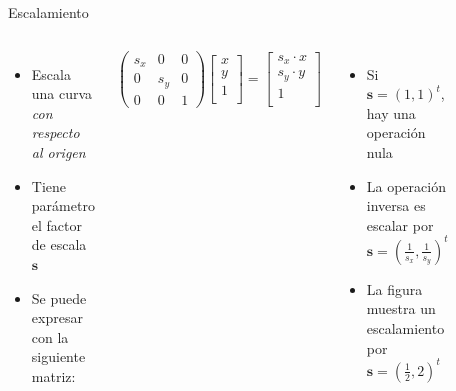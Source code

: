 \begin{frame}{Escalamiento}
\begin{columns}
\begin{itemize}
    \item Escala una curva \emph{con respecto al origen}
    \item Tiene parámetro el factor de escala $\mathbf{s}$
    \item Se puede expresar con la siguiente matriz:
\end{itemize}
$$
\begin{pmatrix}
s_x & 0 & 0 \\
0 & s_y & 0 \\
0 & 0 & 1
\end{pmatrix}
\begin{bmatrix}
x \\
y \\
1 \\
\end{bmatrix}
=
\begin{bmatrix}
s_x \cdot x  \\
s_y \cdot y  \\
1 \\
\end{bmatrix}
$$
\begin{itemize}
    \item Si $\mathbf{s} = ( 1 , 1 )^t$, hay una operación nula
    \item La operación inversa es escalar por $\mathbf{s} = (\frac{1}{s_x} , \frac{1}{s_y} )^t$
    \item La figura muestra un escalamiento por $\mathbf{s} = ( \frac{1}{2} , 2 )^t$
\end{itemize}
\begin{figure}[htp]
 \centering
 \begin{subfigure}[b]{0.4\textwidth}
   \includegraphics[width=\textwidth]{img/Square}

\end{subfigure}
\end{figure}
\end{columns}
\end{frame}
